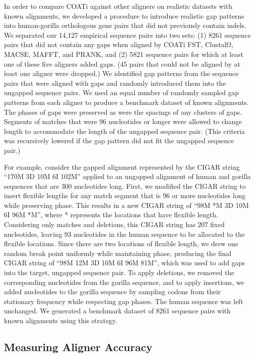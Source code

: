 \documentclass[12pt,letterpaper]{article}
\begin{document}
In order to compare COATi against other aligners on realistic datasets with known alignments, we developed a procedure to introduce realistic gap patterns into human-gorilla orthologous gene pairs that did not previously contain indels. We separated our 14,127 empirical sequence pairs into two sets: %
(1) 8261 sequence pairs that did not contain any gaps when aligned by COATi FST, ClustalΩ, MACSE, MAFFT, and PRANK, and (2) 5821 sequence pairs for which at least one of these five aligners added gaps.
(45 pairs that could not be aligned by at least one aligner were dropped.) We identified gap patterns from the sequence pairs that were aligned with gaps and randomly introduced them into the ungapped sequence pairs. We used an equal number of randomly sampled gap patterns from each aligner to produce a benchmark dataset of known alignments. The phases of gaps were preserved as were the spacings of any clusters of gaps. Segments of matches that were 96 nucleotides or longer were allowed to change length to accommodate the length of the ungapped sequence pair. (This criteria was recursively lowered if the gap pattern did not fit the ungapped sequence pair.)

For example, consider the gapped alignment represented by the CIGAR string
%
``170M 3D 10M 6I 102M'' %
%
applied to an ungapped alignment of human and gorilla sequences that are 300 nucleotides long. First, we modified the CIGAR string to insert flexible lengths for any match segment that is 96 or more nucleotides long while preserving phase. This results in a new CIGAR string of
%
``98M *M 3D 10M 6I 96M *M'',
%
where * represents the locations that have flexible length. Considering only matches and deletions, this CIGAR string has 207 fixed nucleotides, leaving 93 nucleotides in the human sequence to be allocated to the flexible locations. Since there are two locations of flexible length, we drew one random break point uniformly while maintaining phase, producing the final CIGAR string of
%
``98M 12M 3D 10M 6I 96M 81M'',
%
which was used to add gaps into the target, ungapped sequence pair.
To apply deletions, we removed the corresponding nucleotides from the gorilla sequence, and to apply insertions, we added nucleotides to the gorilla sequence by sampling codons from their stationary frequency while respecting gap phases. The human sequence was left unchanged.
%
We generated a benchmark dataset of 8261 sequence pairs with known alignments using this strategy.

\subsection*{Measuring Aligner Accuracy}
\end{document}
